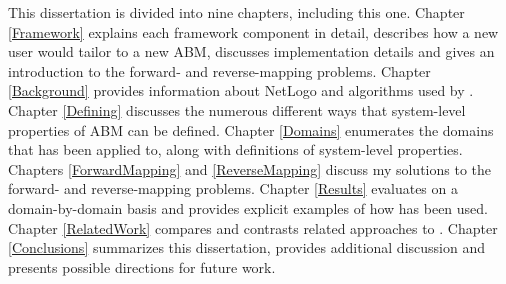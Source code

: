 This dissertation is divided into nine chapters, including this one.
Chapter \ref{Framework} explains each framework component in detail, describes how a new user would tailor \fw to a new ABM, discusses implementation details and gives an introduction to the forward- and reverse-mapping problems.
Chapter \ref{Background} provides information about NetLogo and algorithms used by \fw.
Chapter \ref{Defining} discusses the numerous different ways that system-level properties of ABM can be defined.
Chapter \ref{Domains} enumerates the domains that \fw has been applied to, along with definitions of system-level properties.
Chapters \ref{ForwardMapping} and \ref{ReverseMapping} discuss my solutions to the forward- and reverse-mapping problems.
Chapter \ref{Results} evaluates \fw on a domain-by-domain basis and provides explicit examples of how \fw has been used.
Chapter \ref{RelatedWork} compares and contrasts related approaches to \fw.
Chapter \ref{Conclusions} summarizes this dissertation, provides additional discussion and presents possible directions for future work.


 





